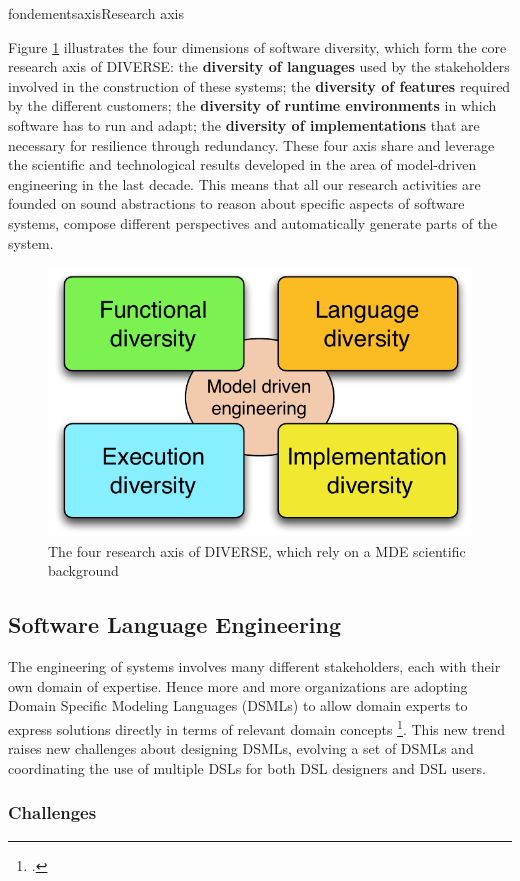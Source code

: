 \documentclass{ra2018}
\newcommand{\team}{DIVERSE}
\begin{document}
\begin{module}{fondements}{axis}{Research axis}
\label{sec:axis}

Figure \ref{fig:axis} illustrates the four dimensions of software diversity, which form the core research axis of \team{}: the \textbf{diversity of languages} used by the stakeholders involved in the construction of these systems; the \textbf{diversity of features} required by the different customers; the \textbf{diversity of runtime environments} in which software has to run and adapt; the \textbf{diversity of implementations} that are necessary for resilience through redundancy. 
These four axis share and leverage the scientific and technological results developed in the area of model-driven engineering in the last decade. 
This means that all our research activities are founded on sound abstractions to reason about specific aspects of software systems, compose different perspectives and automatically generate parts of the system.

\begin{figure}
\centering
\includegraphics[width=0.5\columnwidth]{IMG/research-axis.pdf}
\caption{The four research axis of \team{}, which rely on a MDE scientific background}
\label{fig:axis}
\end{figure}

\subsection{Software Language Engineering}
\label{sec:axis-sle}

The engineering of systems involves many different stakeholders, each with their own domain of expertise. Hence more and more organizations are adopting Domain Specific Modeling Languages (DSMLs) to allow domain experts to express solutions directly in terms of relevant domain concepts   \footcite{Schmidt06,France07}. This new trend raises new challenges about designing DSMLs, evolving a set of DSMLs and coordinating the use of multiple DSLs for both DSL designers and DSL users.


\subsubsection*{Challenges} 


\end{module}
\end{document}
